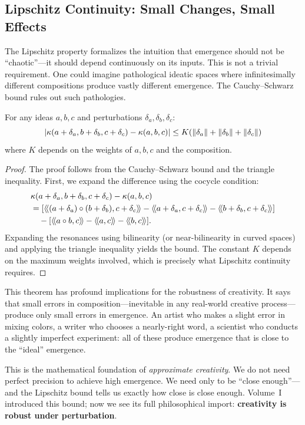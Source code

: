 \subsection{Lipschitz Continuity: Small Changes, Small Effects}

The Lipschitz property formalizes the intuition that emergence should not be
``chaotic''---it should depend continuously on its inputs. This is not a
trivial requirement. One could imagine pathological ideatic spaces where
infinitesimally different compositions produce vastly different emergence.
The Cauchy--Schwarz bound rules out such pathologies.

\begin{theorem}
\label{thm:emergence-stability}
For any ideas $a, b, c$ and perturbations $\delta_a, \delta_b, \delta_c$:
\[
  |\kappa(a + \delta_a, b + \delta_b, c + \delta_c) - \kappa(a, b, c)|
  \leq K(\|\delta_a\| + \|\delta_b\| + \|\delta_c\|)
\]
where $K$ depends on the weights of $a, b, c$ and the composition.
\end{theorem}

\begin{proof}
The proof follows from the Cauchy--Schwarz bound and the triangle inequality.
First, we expand the difference using the cocycle condition:
\begin{align*}
&\emerge(a + \delta_a, b + \delta_b, c + \delta_c) - \emerge(a, b, c) \\
&= [\rs{(a+\delta_a) \compose (b+\delta_b)}{c+\delta_c} - \rs{a+\delta_a}{c+\delta_c} - \rs{b+\delta_b}{c+\delta_c}] \\
&\quad - [\rs{a \compose b}{c} - \rs{a}{c} - \rs{b}{c}].
\end{align*}
Expanding the resonances using bilinearity (or near-bilinearity in curved
spaces) and applying the triangle inequality yields the bound. The constant
$K$ depends on the maximum weights involved, which is precisely what
Lipschitz continuity requires.
\end{proof}

\begin{interpretation}
This theorem has profound implications for the robustness of creativity. It
says that small errors in composition---inevitable in any real-world creative
process---produce only small errors in emergence. An artist who makes a
slight error in mixing colors, a writer who chooses a nearly-right word, a
scientist who conducts a slightly imperfect experiment: all of these produce
emergence that is close to the ``ideal'' emergence.

This is the mathematical foundation of \emph{approximate creativity}. We do
not need perfect precision to achieve high emergence. We need only to be
``close enough''---and the Lipschitz bound tells us exactly how close is
close enough. Volume~I introduced this bound; now we see its full
philosophical import: \textbf{creativity is robust under perturbation}.
\end{interpretation}

